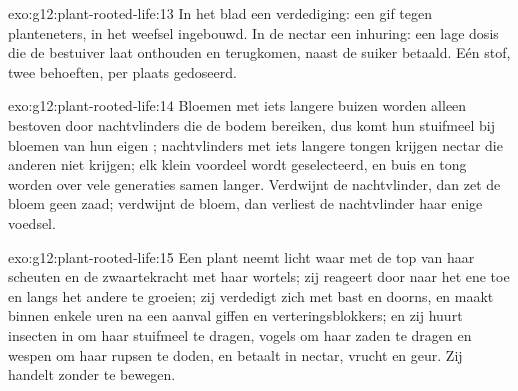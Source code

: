 \begin{solution}{exo:g12:plant-rooted-life:13}
In het blad een verdediging: een gif tegen planteneters, in het weefsel
ingebouwd. In de nectar een inhuring: een lage dosis die de bestuiver laat
onthouden en terugkomen, naast de suiker betaald. Eén stof, twee
behoeften, per plaats gedoseerd.
\end{solution}

\begin{solution}{exo:g12:plant-rooted-life:14}
Bloemen met iets langere buizen worden alleen bestoven door nachtvlinders
die de bodem bereiken, dus komt hun stuifmeel bij bloemen van hun eigen
; nachtvlinders met iets langere tongen krijgen nectar die anderen
niet krijgen; elk klein voordeel wordt geselecteerd, en buis en tong
worden over vele generaties samen langer. Verdwijnt de nachtvlinder, dan
zet de bloem geen zaad; verdwijnt de bloem, dan verliest de nachtvlinder
haar enige voedsel.
\end{solution}

\begin{solution}{exo:g12:plant-rooted-life:15}
Een plant neemt licht waar met de top van haar scheuten en de
zwaartekracht met haar wortels; zij reageert door naar het ene toe en
langs het andere te groeien; zij verdedigt zich met bast en doorns, en
maakt binnen enkele uren na een aanval giffen en verteringsblokkers; en
zij huurt insecten in om haar stuifmeel te dragen, vogels om haar zaden te
dragen en wespen om haar rupsen te doden, en betaalt in nectar, vrucht en
geur. Zij handelt zonder te bewegen.
\end{solution}

